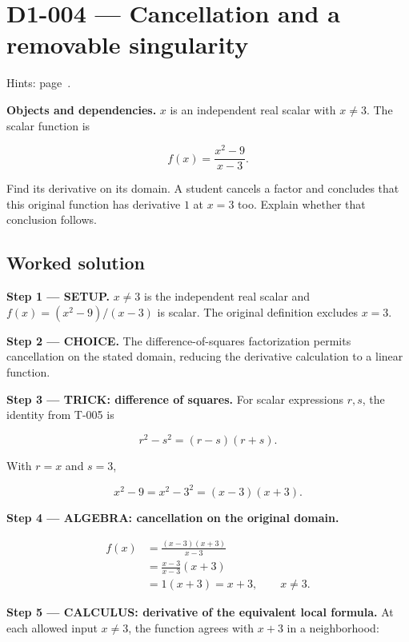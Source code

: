 \documentclass[11pt,oneside,openany]{book}
\begin{document}
\section{D1-004 --- Cancellation and a removable singularity}
\label{problem:D1-004}
{\small Hints: page~\pageref{hints:D1-004}.}\par\medskip

\textbf{Objects and dependencies.} \(x\) is an independent real scalar with \(x\ne3\).
The scalar function is

\[
f(x)=\frac{x^2-9}{x-3}.
\]

Find its derivative on its domain. A student cancels a factor and concludes that
this original function has derivative \(1\) at \(x=3\) too. Explain whether that
conclusion follows.
\subsection*{Worked solution}

\textbf{Step 1 --- SETUP.} \(x\ne3\) is the independent real scalar and
\(f(x)=(x^2-9)/(x-3)\) is scalar. The original definition excludes \(x=3\).

\begin{ChoiceStep}
\textbf{Step 2 --- CHOICE.} The difference-of-squares factorization permits cancellation on the stated
domain, reducing the derivative calculation to a linear function.

\end{ChoiceStep}
\begingroup\color{TrickPurple}
\textbf{Step 3 --- TRICK: difference of squares.} For scalar expressions \(r,s\),
the identity from T-005 is

\[
r^2-s^2=(r-s)(r+s).
\]

With \(r=x\) and \(s=3\),

\[
x^2-9=x^2-3^2=(x-3)(x+3).
\]

\endgroup
\begingroup\color{AlgebraBlue}
\textbf{Step 4 --- ALGEBRA: cancellation on the original domain.}

\[
\begin{aligned}
f(x)&=\frac{(x-3)(x+3)}{x-3}\\
&=\frac{x-3}{x-3}(x+3)\\
&=1(x+3)=x+3,\qquad x\ne3.
\end{aligned}
\]

\endgroup
\textbf{Step 5 --- CALCULUS: derivative of the equivalent local formula.} At each
allowed input \(x\ne3\), the function agrees with \(x+3\) in a neighborhood:
\end{document}
